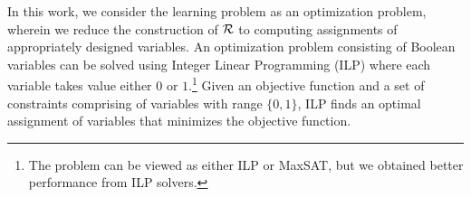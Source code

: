 In this work, we consider the learning problem as an optimization problem, wherein we reduce the construction of ${\mathcal{R}}$ to computing assignments of appropriately designed variables.  An optimization problem consisting of Boolean variables can be solved using Integer Linear Programming (ILP) where each variable takes value either $ 0 $ or $ 1 $.\footnote{The problem can be viewed as either ILP or MaxSAT, but we obtained better performance from ILP solvers.} Given an objective function and a set of constraints comprising of variables with range $ \{0,1\} $, ILP finds an optimal assignment of variables that minimizes the objective function.












